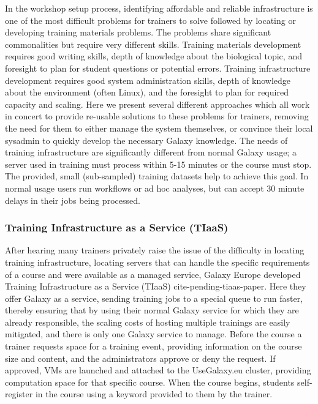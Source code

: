 \documentclass[10pt,letterpaper]{article}
\begin{document}
In the workshop setup process, identifying affordable and reliable infrastructure is one of the most difficult problems for trainers to solve followed by locating or developing training materials problems.
The problems share significant commonalities but require very different skills.
Training materials development requires good writing skills, depth of knowledge about the biological topic, and foresight to plan for student questions or potential errors.
Training infrastructure development requires good system administration skills, depth of knowledge about the environment (often Linux), and the foresight to plan for required capacity and scaling.
Here we present several different approaches which all work in concert to provide re-usable solutions to these problems for trainers, removing the need for them to either manage the system themselves, or convince their local sysadmin to quickly develop the necessary Galaxy knowledge.
The needs of training infrastructure are significantly different from normal Galaxy usage; a server used in training must process within 5-15 minutes or the course must stop.
The provided, small (sub-sampled) training datasets help to achieve this goal.
In normal usage users run workflows or ad hoc analyses, but can accept 30 minute delays in their jobs being processed.

\subsubsection*{Training Infrastructure as a Service (TIaaS)}
After hearing many trainers privately raise the issue of the difficulty in locating training infrastructure, locating servers that can handle the specific requirements of a course and were available as a managed service, Galaxy Europe developed Training Infrastructure as a Service (TIaaS) {cite-pending-tiaas-paper}.
Here they offer Galaxy as a service, sending training jobs to a special queue to run faster, thereby ensuring that by using their normal Galaxy service for which they are already responsible, the scaling costs of hosting multiple trainings are easily mitigated, and there is only one Galaxy service to manage.
Before the course a trainer requests space for a training event, providing information on the course size and content, and the administrators approve or deny the request.
If approved, VMs are launched and attached to the UseGalaxy.eu cluster, providing computation space for that specific course.
When the course begins, students self-register in the course using a keyword provided to them by the trainer.
\end{document}
